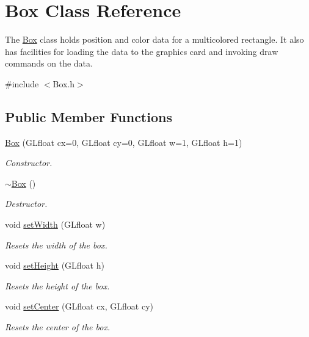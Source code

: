 \hypertarget{class_box}{}\section{Box Class Reference}
\label{class_box}


The \hyperlink{class_box}{Box} class holds position and color data for a multicolored rectangle. It also has facilities for loading the data to the graphics card and invoking draw commands on the data.  




{\ttfamily \#include $<$Box.\+h$>$}

\subsection*{Public Member Functions}
\begin{DoxyCompactItemize}
\item 
\hyperlink{class_box_a60ab766bbad3c0e5abe69b50cb3fe6ed}{Box} (G\+Lfloat cx=0, G\+Lfloat cy=0, G\+Lfloat w=1, G\+Lfloat h=1)
\begin{DoxyCompactList}\small\item\em Constructor. \end{DoxyCompactList}\item 
\hyperlink{class_box_a6a5e09398e85d602a046b429062fb9c2}{$\sim$\+Box} ()
\begin{DoxyCompactList}\small\item\em Destructor. \end{DoxyCompactList}\item 
void \hyperlink{class_box_a272734cc296e7b34a53efc6f06336b00}{set\+Width} (G\+Lfloat w)
\begin{DoxyCompactList}\small\item\em Resets the width of the box. \end{DoxyCompactList}\item 
void \hyperlink{class_box_ac5556af3ef01d51abbf22d98c6c5880c}{set\+Height} (G\+Lfloat h)
\begin{DoxyCompactList}\small\item\em Resets the height of the box. \end{DoxyCompactList}\item 
void \hyperlink{class_box_a0f33ff4b10edd0fe29ebd65087842610}{set\+Center} (G\+Lfloat cx, G\+Lfloat cy)
\begin{DoxyCompactList}\small\item\em Resets the center of the box. \end{DoxyCompactList}\item 

\end{DoxyCompactItemize}

